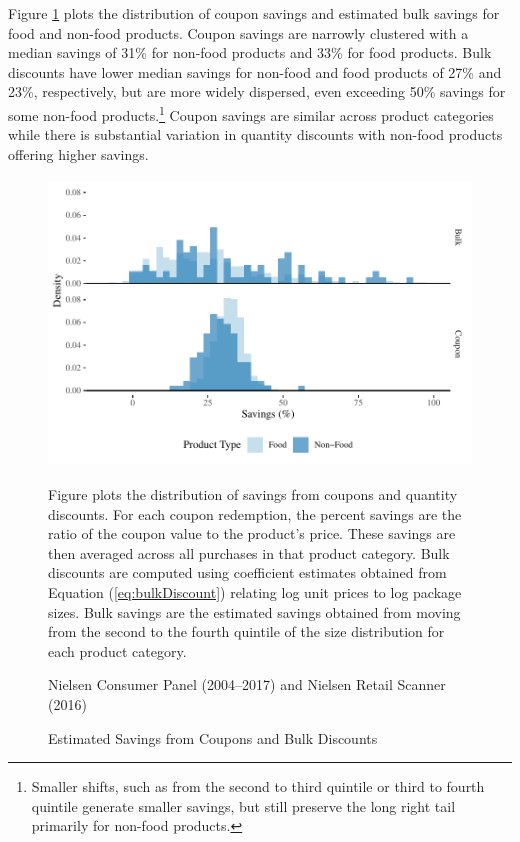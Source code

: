 \documentclass[AER]{AEA_mal}
\begin{document}
Figure \ref{fig:couponBulkSavings} plots the distribution of coupon savings and estimated bulk savings for food and non-food products. Coupon savings are narrowly clustered with a median savings of 31\% for non-food products and 33\% for food products. Bulk discounts have lower median savings for non-food and food products of 27\% and 23\%, respectively, but are more widely dispersed, even exceeding 50\% savings for some non-food products.\footnote{Smaller shifts, such as from the second to third quintile or third to fourth quintile generate smaller savings, but still preserve the long right tail primarily for non-food products.} Coupon savings are similar across product categories while there is substantial variation in quantity discounts with non-food products offering higher savings.

\begin{figure}[!htb]
 \centering
 \caption{Estimated Savings from Coupons and Bulk Discounts}
 \includegraphics[width = 5in, height = 3in]{../5_figures/couponBulkSavingsColor.pdf}
 \begin{figurenotes}
Figure plots the distribution of savings from coupons and quantity discounts. For each coupon redemption, the percent savings are the ratio of the coupon value to the product's price. These savings are then averaged across all purchases in that product category. Bulk discounts are computed using coefficient estimates obtained from Equation (\ref{eq:bulkDiscount}) relating log unit prices to log package sizes. Bulk savings are the estimated savings obtained from moving from the second to the fourth quintile of the size distribution for each product category.
\end{figurenotes}
\begin{figurenotes}[Source]
Nielsen Consumer Panel (2004--2017) and Nielsen Retail Scanner (2016)
\end{figurenotes}
\label{fig:couponBulkSavings}
\end{figure}
\end{document}
